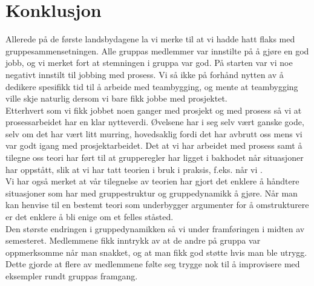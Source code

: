\chapter{Konklusjon}
Allerede på de første landsbydagene la vi merke til at vi hadde hatt flaks med
gruppesammensetningen. Alle gruppas medlemmer var innstilte på å gjøre en god
jobb, og vi merket fort at stemningen i gruppa var god. På starten var vi
noe negativt innstilt til jobbing med prosess. Vi så ikke på forhånd nytten
av å dedikere spesifikk tid til å arbeide med teambygging, og mente at teambygging
ville skje naturlig dersom vi bare fikk jobbe med prosjektet. \\

Etterhvert som vi fikk jobbet noen ganger med prosjekt og med prosess så vi at
prosessarbeidet har en klar nytteverdi. Øvelsene har i seg selv vært ganske
gode, selv om det har vært litt murring, hovedsaklig fordi det har avbrutt oss
mens vi var godt igang med prosjektarbeidet. Det at vi har arbeidet med prosess
samt å tilegne oss teori har ført til at grupperegler har ligget i bakhodet når
situasjoner har oppstått, slik at vi har tatt teorien i bruk i praksis, f.eks.
når vi .\\

Vi har også merket at vår tilegnelse av teorien har gjort det enklere å håndtere
situasjoner som har med gruppestruktur og gruppedynamikk å gjøre. Når man kan henvise
til en bestemt teori som underbygger argumenter for å omstrukturere er det
enklere å bli enige om et felles ståsted.\\

Den største endringen i gruppedynamikken så vi under framføringen i midten av
semesteret. Medlemmene fikk inntrykk av at de andre på gruppa var oppmerksomme
når man snakket, og at man fikk god støtte hvis man ble utrygg. Dette gjorde at
flere av medlemmene følte seg trygge nok til å improvisere med eksempler rundt
gruppas framgang. \\


